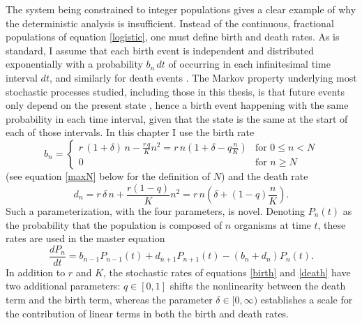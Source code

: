 The system being constrained to integer populations gives a clear example of why the deterministic analysis is insufficient. 
Instead of the continuous, fractional populations of equation \ref{logistic}, one must define birth and death rates. 
As is standard, I assume that each birth event is independent and distributed exponentially with a probability $b_n\,dt$ of occurring in each infinitesimal time interval $dt$, and similarly for death events \cite{Nisbet1982,Gardiner2004,VanKampen1992}. 
The Markov property underlying most stochastic processes studied, including those in this thesis, is that future events only depend on the present state \cite{Nisbet1982,Gardiner2004,VanKampen1992}, hence a birth event happening with the same probability in each time interval, given that the state is the same at the start of each of those intervals. 
In this chapter I use the birth rate
\begin{equation}
b_n = 
\begin{cases}
 r\,(1 + \delta)\,n - \frac{r\,q}{K}n^2 = r\,n\left(1+\delta-q\frac{n}{K}\right) &\text{for } 0\leq n < N \\
 0																				 &\text{for } n \geq N
\end{cases}
 \label{birth}
\end{equation}
(see equation \ref{maxN} below for the definition of $N$)
and the death rate
\begin{equation}
d_n = r\,\delta\,n + \frac{r(1-q)}{K} n^2 = r\,n\left(\delta+(1-q)\frac{n}{K}\right).
\label{death}
\end{equation}
Such a parameterization, with the four parameters, is novel. 
Denoting $P_n(t)$ as the probability that the population is composed of $n$ organisms at time $t$, these rates are used in the master equation
\begin{equation}
\frac{dP_n}{dt} =  b_{n-1}P_{n-1}(t) + d_{n+1}P_{n+1}(t) - (b_n+d_n)P_n(t).
 \label{master-eqn}
\end{equation}
In addition to $r$ and $K$, the stochastic rates of equations \ref{birth} and \ref{death} have two additional parameters: $q\in[0,1]$ shifts the nonlinearity between the death term and the birth term, whereas the parameter $\delta\in[0,\infty)$ establishes a scale for the contribution of linear terms in both the birth and death rates. 
